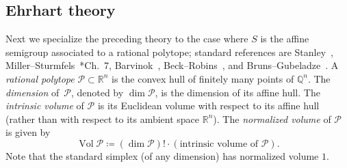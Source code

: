\documentclass[noamsfonts,10pt]{amsart}
\newcommand{\R}{\mathbb{R}}
\renewcommand{\P}{\mathcal{P}}
\DeclareMathOperator{\Vol}{Vol}
\newcommand{\1}{\mathbf{1}}
\theoremstyle{plain}
\theoremstyle{definition}
\numberwithin{equation}{section}
\begin{document}
\subsection*{Ehrhart theory}

Next we specialize the preceding theory to the case where $S$ is the affine semigroup associated to a rational polytope;
standard references are Stanley~\cites{Stanley1980, StanleyCCA}, Miller--Sturmfels~\cite{MillerSturmfels}*{Ch.~7}, Barvinok~\cite{Barvinok}, Beck--Robins~\cite{BeckRobins}, and Bruns--Gubeladze~\cite{BrunsGubeladze}.
A \emph{rational
polytope} $\P \subset \R^n$ is the convex hull of finitely many
points of $\mathbb{Q}^n$.
The \emph{dimension} of~$\P$, denoted by $\dim \P$, is the dimension of its affine hull.
The \emph{intrinsic volume} of $\P$ is its Euclidean volume with respect to its affine hull (rather than with respect to its ambient space $\R^n$). 
The \emph{normalized volume} of $\P$ is given by
\begin{equation}
    \label{Vol}
    \Vol \P \coloneqq (\dim \P)! \cdot (\text{intrinsic volume of $\P$}).
\end{equation}
Note that the standard simplex (of any dimension) has normalized volume $1$.
\end{document}
